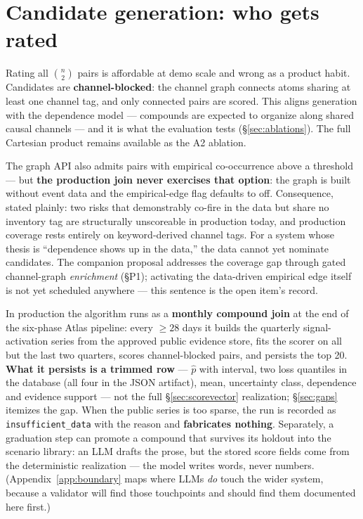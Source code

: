 \documentclass[11pt]{article}
\begin{document}
\section{Candidate generation: who gets rated}
\label{sec:candidates}

Rating all $\binom{n}{2}$ pairs is affordable at demo scale and wrong as a
product habit. Candidates are \textbf{channel-blocked}: the channel graph
connects atoms sharing at least one channel tag, and only connected pairs
are scored. This aligns generation with the dependence model --- compounds
are expected to organize along shared causal channels --- and it is what the
evaluation tests (\S\ref{sec:ablations}). The full Cartesian product remains
available as the A2 ablation.

The graph API also admits pairs with empirical co-occurrence above a
threshold --- but \textbf{the production join never exercises that option}:
the graph is built without event data and the empirical-edge flag defaults
to off. Consequence, stated plainly: two risks that demonstrably co-fire in
the data but share no inventory tag are structurally unscoreable in
production today, and production coverage rests entirely on keyword-derived
channel tags. For a system whose thesis is ``dependence shows up in the
data,'' the data cannot yet nominate candidates. The companion proposal
addresses the coverage gap through gated channel-graph \emph{enrichment}
(\S P1); activating the data-driven empirical edge itself is not yet
scheduled anywhere --- this sentence is the open item's record.

In production the algorithm runs as a \textbf{monthly compound join} at the
end of the six-phase Atlas pipeline: every $\ge 28$ days it builds the
quarterly signal-activation series from the approved public evidence store,
fits the scorer on all but the last two quarters, scores channel-blocked
pairs, and persists the top 20. \textbf{What it persists is a trimmed row}
--- $\hat p$ with interval, two loss quantiles in the database (all four in
the JSON artifact), mean, uncertainty class, dependence and evidence support
--- not the full \S\ref{sec:scorevector} realization; \S\ref{sec:gaps}
itemizes the gap. When the public series is too sparse, the run is recorded
as \texttt{insufficient\_data} with the reason and \textbf{fabricates
nothing}. Separately, a graduation step can promote a compound that survives
its holdout into the scenario library: an LLM drafts the prose, but the
stored score fields come from the deterministic realization --- the model
writes words, never numbers. (Appendix~\ref{app:boundary} maps where LLMs
\emph{do} touch the wider system, because a validator will find those
touchpoints and should find them documented here first.)
\end{document}
